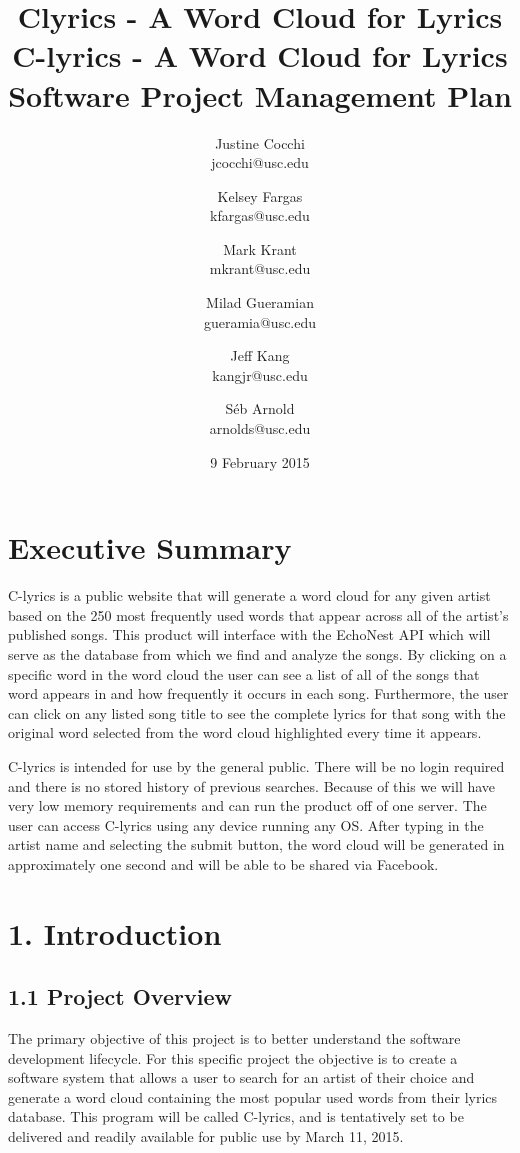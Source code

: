 \documentclass[]{article}
\title{Clyrics - A Word Cloud for Lyrics}
\author{Justine Cocchi\\jcocchi@usc.edu \and Kelsey Fargas\\kfargas@usc.edu \and Mark Krant \\ mkrant@usc.edu\and Milad Gueramian\\gueramia@usc.edu \and Jeff Kang\\kangjr@usc.edu \and Séb Arnold\\arnolds@usc.edu}
\date{9 February 2015}
\title{%
	C-lyrics - A Word Cloud for Lyrics \\
	\large Software Project Management Plan}
\begin{document}
\maketitle

\pagebreak

\tableofcontents
\setcounter{tocdepth}{3}

\pagebreak

\section{Executive Summary}\label{executive-summary}

C-lyrics is a public website that will generate a word cloud for any given artist based on the 250 most frequently used words that appear across all of the artist’s published songs. This product will interface with the EchoNest API which will serve as the database from which we find and analyze the songs. By clicking on a specific word in the word cloud the user can see a list of all of the songs that word appears in and how frequently it occurs in each song. Furthermore, the user can click on any listed song title to see the complete lyrics for that song with the original word selected from the word cloud highlighted every time it appears. 

C-lyrics is intended for use by the general public. There will be no login required and there is no stored history of previous searches. Because of this we will have very low memory requirements and can run the product off of one server. The user can access C-lyrics using any device running any OS. After typing in the artist name and selecting the submit button, the word cloud will be generated in approximately one second and will be able to be shared via Facebook. 

\pagebreak

\section{1. Introduction}\label{introduction}

\subsection{1.1 Project Overview}\label{project-overview}

The primary objective of this project is to better understand the
software development lifecycle. For this specific project the objective
is to create a software system that allows a user to search for an
artist of their choice and generate a word cloud containing the most
popular used words from their lyrics database. This program will be
called C-lyrics, and is tentatively set to be delivered and readily
available for public use by March 11, 2015.
\end{document}
